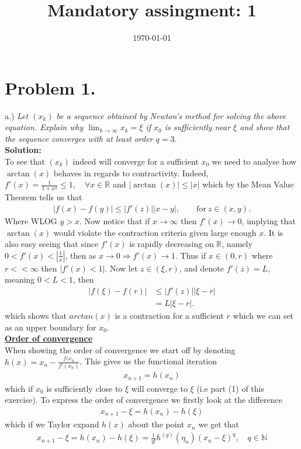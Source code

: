 \documentclass[12pt,
               a4paper,
               article,
               oneside,
               norsk,oldfontcommands]{memoir}
\date{\today}
\title{Mandatory assingment: 1}
\newcommand{\R}{\mathbb{R}}
\newcommand{\spaze}{\vspace{4mm}\\}
\begin{document}
\header{}
\section*{\centering Problem 1.}
a.) \emph{Let $(x_k)$ be a sequence obtained by Newton’s method for solving the above equation. Explain why $\lim_{k \to \infty} x_k = \xi$ if $x_0$ is sufficiently near $\xi$ and show that the sequence converges with at least order $q = 3.$} \spaze 
\textbf{Solution:} \spaze 
To see that $(x_k)$ indeed will converge for a sufficient $x_0$ we need to analyse how $\arctan(x)$ behaves in regards to contractivity. Indeed, $f'(x) = \frac{1}{1+x^2} \leq 1, \quad \forall x \in \R$ and $| \arctan(x) | \leq |x|$ which by the Mean Value Theorem tells us that 
\begin{align*}
|f(x) - f(y)| \leq |f'(z)| |x - y|, \qquad \text{for} \  z \in (x, y).
\end{align*}
Where WLOG $y > x$. Now notice that if $x \rightarrow \infty$ then $f'(x) \rightarrow 0$, implying that $\arctan(x)$ would violate the contraction criteria given large enough $x$. It is also easy seeing that since $f'(x)$ is rapidly decreasing on $\mathbb{R}$, namely $0< f'(x) < |\frac{1}{x}|$, then as $x \rightarrow 0 \Rightarrow f'(x) \rightarrow 1$. Thus if $x \in (0, r)$ where $r << \infty$ then $|f'(x) < 1|$. Now let $z \in (\xi, r)$, and denote $f'(z) = L$, meaning $ 0 < L < 1$, then  
\begin{align*}
|f(\xi) - f(r)| &\leq |f'(z)| |\xi - r| \\[5pt]
&= L  |\xi - r|.
\end{align*}
which shows that $arctan(x)$ is a contraction for a sufficient $r$ which we can set as an upper boundary for $x_0$. \spaze 
\underline{\textbf{Order of convergence}}\spaze 
When showing the order of convergence we start off by denoting $h(x) = x_n - \frac{f(x_n}{f'(x_n)}$. This gives us the functional iteration 
\begin{align*}
x_{n+1} = h(x_n)
\end{align*}
which if $x_0$ is sufficiently close to $\xi$ will converge to $\xi$ (i.e part (1) of this exercise). To express the order of convergence we firstly look at the difference 
\begin{align*}
x_{n+1} - \xi = h(x_n) - h(\xi)
\end{align*}
which if we Taylor expand $h(x)$ about the point $x_n$ we get that 
\begin{align*}
x_{n+1} - \xi = h(x_n) - h(\xi) = \frac{1}{q!} h^{(q)} (\eta_{n})(x_n - \xi)^q, \quad q \in \mathbb{N}
\end{align*}
\end{document}
